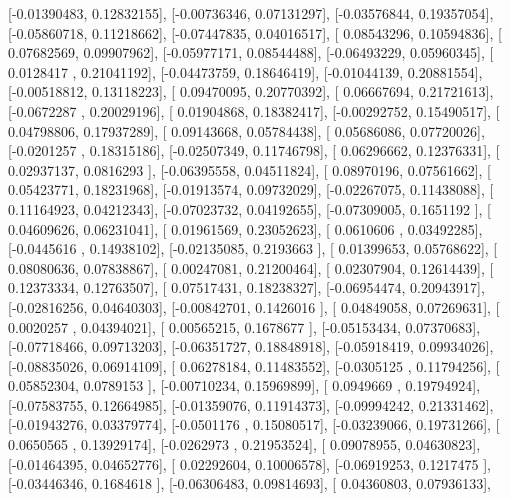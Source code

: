 \documentclass{article}
\begin{document}
       [-0.01390483,  0.12832155],
       [-0.00736346,  0.07131297],
       [-0.03576844,  0.19357054],
       [-0.05860718,  0.11218662],
       [-0.07447835,  0.04016517],
       [ 0.08543296,  0.10594836],
       [ 0.07682569,  0.09907962],
       [-0.05977171,  0.08544488],
       [-0.06493229,  0.05960345],
       [ 0.0128417 ,  0.21041192],
       [-0.04473759,  0.18646419],
       [-0.01044139,  0.20881554],
       [-0.00518812,  0.13118223],
       [ 0.09470095,  0.20770392],
       [ 0.06667694,  0.21721613],
       [-0.0672287 ,  0.20029196],
       [ 0.01904868,  0.18382417],
       [-0.00292752,  0.15490517],
       [ 0.04798806,  0.17937289],
       [ 0.09143668,  0.05784438],
       [ 0.05686086,  0.07720026],
       [-0.0201257 ,  0.18315186],
       [-0.02507349,  0.11746798],
       [ 0.06296662,  0.12376331],
       [ 0.02937137,  0.0816293 ],
       [-0.06395558,  0.04511824],
       [ 0.08970196,  0.07561662],
       [ 0.05423771,  0.18231968],
       [-0.01913574,  0.09732029],
       [-0.02267075,  0.11438088],
       [ 0.11164923,  0.04212343],
       [-0.07023732,  0.04192655],
       [-0.07309005,  0.1651192 ],
       [ 0.04609626,  0.06231041],
       [ 0.01961569,  0.23052623],
       [ 0.0610606 ,  0.03492285],
       [-0.0445616 ,  0.14938102],
       [-0.02135085,  0.2193663 ],
       [ 0.01399653,  0.05768622],
       [ 0.08080636,  0.07838867],
       [ 0.00247081,  0.21200464],
       [ 0.02307904,  0.12614439],
       [ 0.12373334,  0.12763507],
       [ 0.07517431,  0.18238327],
       [-0.06954474,  0.20943917],
       [-0.02816256,  0.04640303],
       [-0.00842701,  0.1426016 ],
       [ 0.04849058,  0.07269631],
       [ 0.0020257 ,  0.04394021],
       [ 0.00565215,  0.1678677 ],
       [-0.05153434,  0.07370683],
       [-0.07718466,  0.09713203],
       [-0.06351727,  0.18848918],
       [-0.05918419,  0.09934026],
       [-0.08835026,  0.06914109],
       [ 0.06278184,  0.11483552],
       [-0.0305125 ,  0.11794256],
       [ 0.05852304,  0.0789153 ],
       [-0.00710234,  0.15969899],
       [ 0.0949669 ,  0.19794924],
       [-0.07583755,  0.12664985],
       [-0.01359076,  0.11914373],
       [-0.09994242,  0.21331462],
       [-0.01943276,  0.03379774],
       [-0.0501176 ,  0.15080517],
       [-0.03239066,  0.19731266],
       [ 0.0650565 ,  0.13929174],
       [-0.0262973 ,  0.21953524],
       [ 0.09078955,  0.04630823],
       [-0.01464395,  0.04652776],
       [ 0.02292604,  0.10006578],
       [-0.06919253,  0.1217475 ],
       [-0.03446346,  0.1684618 ],
       [-0.06306483,  0.09814693],
       [ 0.04360803,  0.07936133],
\end{document}
